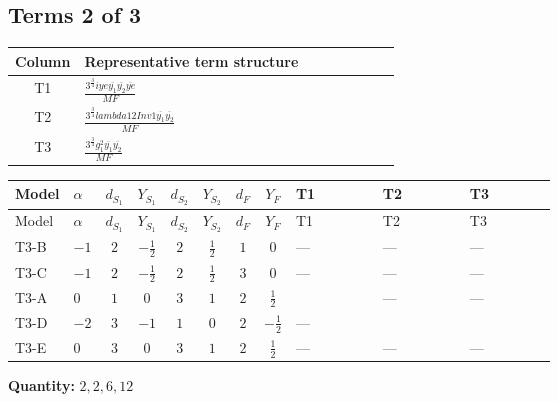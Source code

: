 \documentclass[8pt]{article}
\begin{document}
\begin{landscape}
\subsection*{Terms 2 of 3}
\begin{center}
\begin{tabular}{@{}c >{\raggedright\arraybackslash}p{0.82\linewidth}@{}}
\toprule
Column & Representative term structure \\
\midrule
T1 & \(\displaystyle \frac{3^{\frac{3}{4}} i ye \overline{y_{1}} \overline{y_{2}} \overline{ye}}{MF}\) \\
\midrule
T2 & \(\displaystyle \frac{3^{\frac{3}{4}} lambda12Inv1 \overline{y_{1}} \overline{y_{2}}}{MF}\) \\
\midrule
T3 & \(\displaystyle \frac{3^{\frac{3}{4}} g_{1}^{2} \overline{y_{1}} \overline{y_{2}}}{MF}\) \\
\midrule
\bottomrule
\end{tabular}
\end{center}
\smallskip
\tiny
\begin{longtable}{@{}llcccccc >{\raggedright\arraybackslash}p{0.21\linewidth} >{\raggedright\arraybackslash}p{0.21\linewidth} >{\raggedright\arraybackslash}p{0.21\linewidth}@{}}
\toprule
Model & $\alpha$ & $d_{S_1}$ & $Y_{S_1}$ & $d_{S_2}$ & $Y_{S_2}$ & $d_F$ & $Y_F$ & T1 & T2 & T3 \\
\midrule
\endfirsthead
\toprule
Model & $\alpha$ & $d_{S_1}$ & $Y_{S_1}$ & $d_{S_2}$ & $Y_{S_2}$ & $d_F$ & $Y_F$ & T1 & T2 & T3 \\
\midrule
\endhead
T3-B & $-1$ & $2$ & $-\frac{1}{2}$ & $2$ & $\frac{1}{2}$ & $1$ & $0$ & --- & --- & --- \\
\midrule
T3-C & $-1$ & $2$ & $-\frac{1}{2}$ & $2$ & $\frac{1}{2}$ & $3$ & $0$ & --- & --- & --- \\
\midrule
T3-A & $0$ & $1$ & $0$ & $3$ & $1$ & $2$ & $\frac{1}{2}$ & \scriptsize\adjustbox{max width=\linewidth}{$\begin{gathered} \frac{3^{\frac{3}{4}} i ye \overline{y_{1}} \overline{y_{2}} \overline{ye}}{12 MF}\end{gathered}$} & --- & --- \\
\midrule
T3-D & $-2$ & $3$ & $-1$ & $1$ & $0$ & $2$ & $-\frac{1}{2}$ & --- & \scriptsize\adjustbox{max width=\linewidth}{$\begin{gathered} \frac{3^{\frac{3}{4}} lambda12Inv1 \overline{y_{1}} \overline{y_{2}}}{6 MF}\end{gathered}$} & \scriptsize\adjustbox{max width=\linewidth}{$\begin{gathered} \frac{3^{\frac{3}{4}} g_{1}^{2} \overline{y_{1}} \overline{y_{2}}}{8 MF}\end{gathered}$} \\
\midrule
T3-E & $0$ & $3$ & $0$ & $3$ & $1$ & $2$ & $\frac{1}{2}$ & --- & --- & --- \\
\midrule
\bottomrule
\end{longtable}
\clearpage
\noindent\textbf{Quantity: }$\mathrm{2,2,6,12}$\par\smallskip

\end{landscape}
\end{document}
